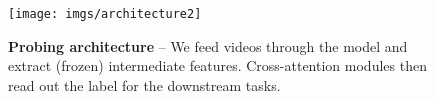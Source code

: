 \begin{figure}[t]
\centering
\texttt{[image: imgs/architecture2]}
\setlength{\belowcaptionskip}{-10pt}
\caption{
\textbf{Probing architecture} --
    We feed videos through the model and extract (frozen) intermediate features.
    Cross-attention modules then read out the label for the downstream tasks.
}
\label{fig:architecture}
\end{figure}
